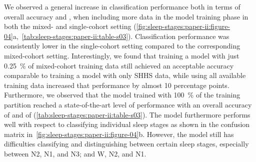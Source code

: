 We observed a general increase in classification performance both in terms of overall accuracy and \cohen, when including more data in the model training phase in both the mixed- and single-cohort setting (\cref{fig:sleep-stages:paper-ii:figure-04}a,~\cref{tab:sleep-stages:paper-ii:table-s03}).
Classification performance was consistently lower in the single-cohort setting compared to the corresponding mixed-cohort setting. 
Interestingly, we found that training a model with just \SI{0.25}{\percent} of mixed-cohort training data still achieved an acceptable accuracy comparable to training a model with only \ac{SHHS} data, while using all available training data increased that performance by almost 10 percentage points.
Furthermore, we observed that the model trained with \SI{100}{\percent} of the training partition reached a state-of-the-art level of performance with an overall accuracy of  and \cohen of  (\cref{tab:sleep-stages:paper-ii:table-s03}).
The model furthermore performs well with respect to classifying individual sleep stages as shown in the confusion matrix in~\cref{fig:sleep-stages:paper-ii:figure-04}b.
However, the model still has difficulties classifying and distinguishing between certain sleep stages, especially between \ac{N2}, \ac{N1}, and \ac{N3}; and \ac{W}, \ac{N2}, and \ac{N1}.


